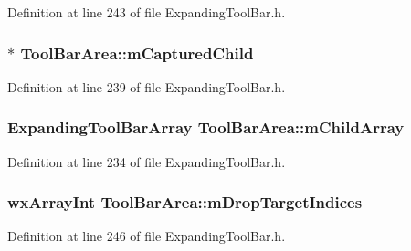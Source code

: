 Definition at line 243 of file Expanding\+Tool\+Bar.\+h.

\subsubsection[{\texorpdfstring{m\+Captured\+Child}{mCapturedChild}}]{$\ast$ Tool\+Bar\+Area\+::m\+Captured\+Child\hspace{0.3cm}{\ttfamily [protected]}}\hypertarget{class_tool_bar_area_a09209913e3356d52837a323cbfbec819}{}\label{class_tool_bar_area_a09209913e3356d52837a323cbfbec819}


Definition at line 239 of file Expanding\+Tool\+Bar.\+h.

\subsubsection[{\texorpdfstring{m\+Child\+Array}{mChildArray}}]{\setlength{\rightskip}{0pt plus 5cm}Expanding\+Tool\+Bar\+Array Tool\+Bar\+Area\+::m\+Child\+Array\hspace{0.3cm}{\ttfamily [protected]}}\hypertarget{class_tool_bar_area_aa0175290668c74cf3464a3d5465f21d5}{}\label{class_tool_bar_area_aa0175290668c74cf3464a3d5465f21d5}


Definition at line 234 of file Expanding\+Tool\+Bar.\+h.

\subsubsection[{\texorpdfstring{m\+Drop\+Target\+Indices}{mDropTargetIndices}}]{\setlength{\rightskip}{0pt plus 5cm}wx\+Array\+Int Tool\+Bar\+Area\+::m\+Drop\+Target\+Indices\hspace{0.3cm}{\ttfamily [protected]}}\hypertarget{class_tool_bar_area_a88d97f65879f88d94c5360ccfd163147}{}\label{class_tool_bar_area_a88d97f65879f88d94c5360ccfd163147}


Definition at line 246 of file Expanding\+Tool\+Bar.\+h.

